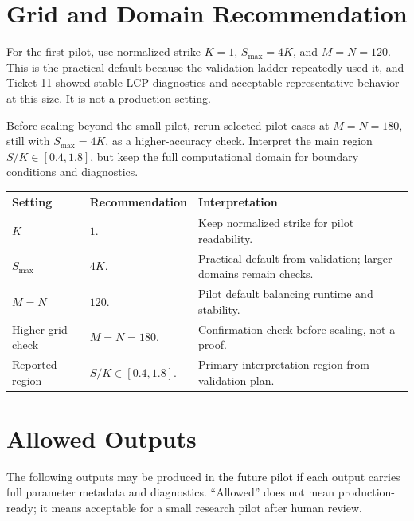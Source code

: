\documentclass[11pt,a4paper]{article}
\begin{document}
\section{Grid and Domain Recommendation}

For the first pilot, use normalized strike \(K=1\), \(S_{\max}=4K\), and \(M=N=120\). This is the
practical default because the validation ladder repeatedly used it, and Ticket 11 showed stable
LCP diagnostics and acceptable representative behavior at this size. It is not a production
setting.

Before scaling beyond the small pilot, rerun selected pilot cases at \(M=N=180\), still with
\(S_{\max}=4K\), as a higher-accuracy check. Interpret the main region \(S/K \in [0.4,1.8]\), but
keep the full computational domain for boundary conditions and diagnostics.

\begin{longtable}{L{0.26\textwidth} L{0.25\textwidth} L{0.38\textwidth}}
\toprule
Setting & Recommendation & Interpretation \\
\midrule
\endhead
\(K\) & \(1\). & Keep normalized strike for pilot readability. \\
\(S_{\max}\) & \(4K\). & Practical default from validation; larger domains remain checks. \\
\(M=N\) & \(120\). & Pilot default balancing runtime and stability. \\
Higher-grid check & \(M=N=180\). & Confirmation check before scaling, not a proof. \\
Reported region & \(S/K \in [0.4,1.8]\). & Primary interpretation region from validation plan. \\
\bottomrule
\end{longtable}

\section{Allowed Outputs}

The following outputs may be produced in the future pilot if each output carries full parameter
metadata and diagnostics. ``Allowed'' does not mean production-ready; it means acceptable for a
small research pilot after human review.
\end{document}

